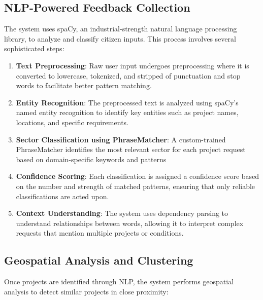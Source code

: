 \documentclass[12pt,a4paper]{report}
\begin{document}
\subsection{NLP-Powered Feedback Collection}
\indent \indent The system uses spaCy, an industrial-strength natural language processing library, to analyze and classify citizen inputs. This process involves several sophisticated steps:

\begin{enumerate}
    \item \textbf{Text Preprocessing}: Raw user input undergoes preprocessing where it is converted to lowercase, tokenized, and stripped of punctuation and stop words to facilitate better pattern matching.
    
    \item \textbf{Entity Recognition}: The preprocessed text is analyzed using spaCy's named entity recognition to identify key entities such as project names, locations, and specific requirements.
    
    \item \textbf{Sector Classification using PhraseMatcher}: A custom-trained PhraseMatcher identifies the most relevant sector for each project request based on domain-specific keywords and patterns

    \item \textbf{Confidence Scoring}: Each classification is assigned a confidence score based on the number and strength of matched patterns, ensuring that only reliable classifications are acted upon.
    
    \item \textbf{Context Understanding}: The system uses dependency parsing to understand relationships between words, allowing it to interpret complex requests that mention multiple projects or conditions.
\end{enumerate}

\subsection{Geospatial Analysis and Clustering}
\indent \indent Once projects are identified through NLP, the system performs geospatial analysis to detect similar projects in close proximity:
\end{document}
